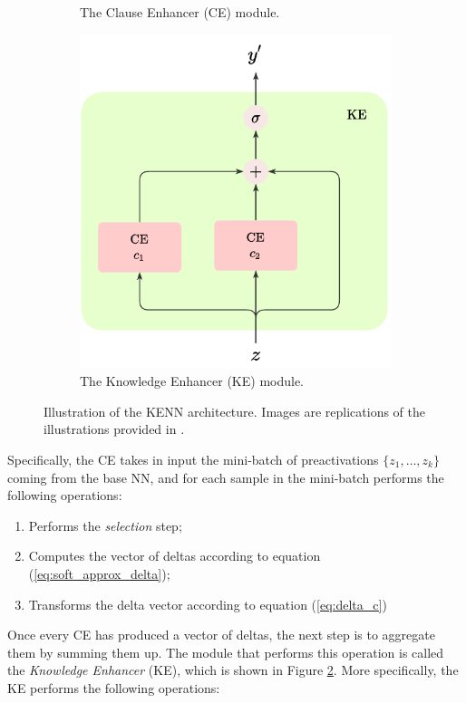 \begin{figure}
\begin{subfigure}{.5\textwidth}
		\caption{The Clause Enhancer (CE) module.}
		\label{fig:ce}
	\end{subfigure}%
	\begin{subfigure}{.5\textwidth}
		\centering
		\includegraphics[width=0.9\linewidth]{figures/KE.pdf}
		\caption{The Knowledge Enhancer (KE) module.}
		\label{fig:ke}	
	\end{subfigure}
	\caption{Illustration of the KENN architecture. Images are replications of the illustrations provided in \cite{daniele2019kenn}.}
	\label{fig:kenn_architecture_unary}
\end{figure}
Specifically, the CE takes in input the mini-batch of preactivations $\{z_1,\dots,z_k\}$ coming from the base NN, and for each sample in the mini-batch performs the following operations:
\begin{enumerate}
	\item Performs the \textit{selection} step;
	\item Computes the vector of deltas according to equation (\ref{eq:soft_approx_delta});
	\item Transforms the delta vector according to equation (\ref{eq:delta_c})
\end{enumerate}
Once every CE has produced a vector of deltas, the next step is to aggregate them by summing them up. The module that performs this operation is called the \textit{Knowledge Enhancer} (KE), which is shown in Figure \ref{fig:ke}. More specifically, the KE performs the following operations:
